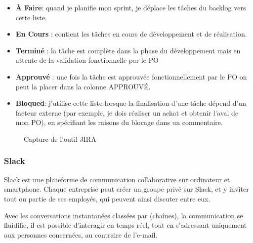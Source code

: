 \begin{itemize}
\item \textbf{\`A Faire}: quand je planifie mon sprint, je d\'eplace les t\^aches du backlog vers cette liste.
\item \textbf{En Cours} : contient les t\^aches en cours de d\'eveloppement et de r\'ealisation.
\item \textbf{Termin\'e} : la t\^ache est compl\`ete dans la phase du d\'eveloppement mais en attente de la validation fonctionnelle par le PO
\item \textbf{Approuv\'e} : une fois la t\^ache est approuv\'ee fonctionnellement par le PO on peut la placer dans la colonne APPROUV\'E.
\item \textbf{Bloqued}: j'utilise cette liste lorsque la finalisation d'une t\^ache d\'epend d'un facteur externe (par exemple, je dois r\'ealiser un achat et obtenir l'aval de mon PO), en sp\'ecifiant les raisons du blocage dans un commentaire.
\end{itemize}

\begin{figure}[!htb]
	\caption{\label{fig:my-label} Capture de l'outil JIRA}
\end{figure}

\subsubsection{Slack}

Slack est une plateforme de communication collaborative sur ordinateur et smartphone. Chaque entreprise peut cr\'eer un groupe priv\'e sur Slack, et y inviter tout ou partie de ses employ\'es, qui peuvent ainsi discuter entre eux.

Avec les conversations instantan\'ees class\'ees par (cha\^ines), la communication se fluidifie, il est possible d'interagir en temps r\'eel, tout en s'adressant uniquement aux personnes concern\'ees, au contraire de l'e-mail.

